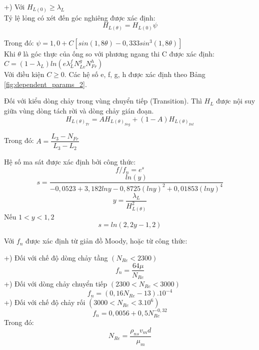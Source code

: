\documentclass[12pt,a4paper]{report}
\begin{document}
+) Với $H_{L(0)} \ge \lambda_L$\\
Tỷ lệ lỏng có xét đến góc nghiêng được xác định:
	\begin{equation}
   		H_{L(\theta)}= H_{L(0)}\psi
    \end{equation}
   
Trong đó: $\psi= 1,0 + C[sin(1,8\theta)-0,333sin^3(1,8\theta)]$\\
Khi $\theta$  là góc thực của ống so với phương ngang thi C được xác định:\\
$C=(1-\lambda_L)ln(e\lambda_L^fN_{Lv}^gN_{Fr}^h)$\\
Với điều kiện $C \ge 0$. Các hệ số e, f, g, h được xác định theo Bảng \ref{fig:dependent_params_2}.

Đối với kiểu dòng chảy trong vùng chuyển tiếp (Transition). Thì $H_L$ được nội suy giữa vùng dòng tách rời và dòng chảy gián đoạn.
	\begin{equation}
   		H_{L(\theta)_{Tr}}=AH_{L(\theta)_{Seg}} + (1-A)H_{L(\theta)_{Int}}
    \end{equation}
    
Trong đó: $A= \dfrac{L_3-N_{Fr}}{L_3-L_2}$

Hệ số ma sát được xác định bởi công thức:
	\begin{equation}
		f / f_n = e^s
	\end{equation}
	\begin{equation}
		s=\dfrac{ln(y)}{-0,0523+3,182lny-0,8725(lny)^2+0,01853(lny)^4}
	\end{equation}
	\begin{equation}
		y=\dfrac{\lambda_L}{H_{L(\theta)}^2}
	\end{equation}
Nếu $1<y<1,2$
	\begin{equation}
		s=ln(2,2y-1,2)
	\end{equation}

Với $f_n$ được xác định từ giản đồ Moody, hoặc từ công thức:

+) Đối với chế độ dòng chảy tầng $(N_{Re}<2300)$
	\begin{equation}
		f_n=\dfrac{64\mu}{N_{Re}}
	\end{equation}
+) Đối với dòng chảy chuyển tiếp $(2300<N_{Re}<3000)$
	\begin{equation}
		f_n=(0,16N_{Re}-13).10^{-4}
	\end{equation}
+) Đối với chế độ chảy rối $(3000<N_{Re}<3.10^6)$
	\begin{equation}
		f_n=0,0056 + 0,5N_{Re}^{-0,32}
	\end{equation}
Trong đó:
	\begin{equation}
		N_{Re}=\dfrac{\rho_{ns}v_md}{\mu_m}
	\end{equation}
\end{document}
